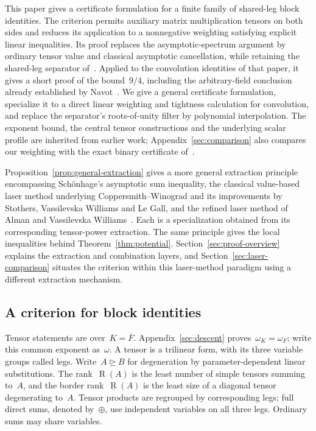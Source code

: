 \documentclass[11pt,letterpaper]{article}
\theoremstyle{definition}
\numberwithin{equation}{section}
\newcommand{\R}{\operatorname{R}}
\newcommand{\br}{\underline{\operatorname{R}}}
\newcommand{\degen}{\unrhd}
\begin{document}
This paper gives a certificate formulation for a finite family of shared-leg block identities. The criterion permits auxiliary matrix multiplication tensors on both sides and reduces its application to a nonnegative weighting satisfying explicit linear inequalities. Its proof replaces the asymptotic-spectrum argument by ordinary tensor value and classical asymptotic cancellation, while retaining the shared-leg separator of~\cite{OpenAI}. Applied to the convolution identities of that paper, it gives a short proof of the bound~$9/4$, including the arbitrary-field conclusion already established by Navot~\cite{Navot26,NavotNote26}. We give a general certificate formulation, specialize it to a direct linear weighting and tightness calculation for convolution, and replace the separator's roots-of-unity filter by polynomial interpolation. The exponent bound, the central tensor constructions and the underlying scalar profile are inherited from earlier work; Appendix~\ref{sec:comparison} also compares our weighting with the exact binary certificate of~\cite{Extraction}.

Proposition~\ref{prop:general-extraction} gives a more general extraction principle encompassing Sch\"onhage's asymptotic sum inequality, the classical value-based laser method underlying Coppersmith--Winograd and its improvements by Stothers, Vassilevska Williams and Le Gall, and the refined laser method of Alman and Vassilevska Williams~\cite{Sch81,CW90,Sto10,VW12,LG14,AW21}. Each is a specialization obtained from its corresponding tensor-power extraction. The same principle gives the local inequalities behind Theorem~\ref{thm:potential}. Section~\ref{sec:proof-overview} explains the extraction and combination layers, and Section~\ref{sec:laser-comparison} situates the criterion within this laser-method paradigm using a different extraction mechanism.

\subsection{A criterion for block identities}

Tensor statements are over~$K=\overline F$. Appendix~\ref{sec:descent} proves~$\omega_K=\omega_F$; write this common exponent as~$\omega$. A tensor is a trilinear form, with its three variable groups called legs. Write~$A\degen B$ for degeneration by parameter-dependent linear substitutions. The rank~$\R(A)$ is the least number of simple tensors summing to~$A$, and the border rank~$\br(A)$ is the least size of a diagonal tensor degenerating to~$A$. Tensor products are regrouped by corresponding legs; full direct sums, denoted by~$\oplus$, use independent variables on all three legs. Ordinary sums may share variables.
\end{document}
